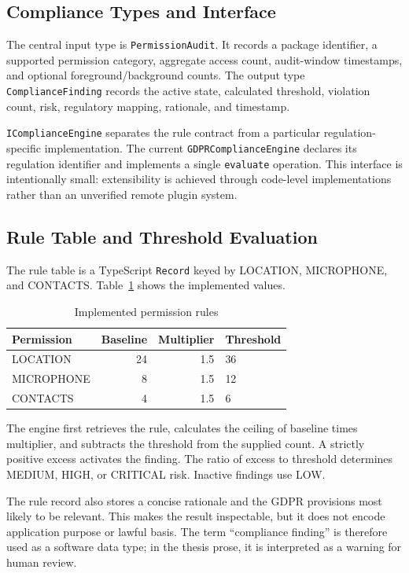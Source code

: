 \subsection{Compliance Types and Interface}

The central input type is \texttt{PermissionAudit}. It records a package identifier, a supported permission category, aggregate access count, audit-window timestamps, and optional foreground/background counts. The output type \texttt{ComplianceFinding} records the active state, calculated threshold, violation count, risk, regulatory mapping, rationale, and timestamp.

\texttt{IComplianceEngine} separates the rule contract from a particular regulation-specific implementation. The current \texttt{GDPRComplianceEngine} declares its regulation identifier and implements a single \texttt{evaluate} operation. This interface is intentionally small: extensibility is achieved through code-level implementations rather than an unverified remote plugin system.

\subsection{Rule Table and Threshold Evaluation}

The rule table is a TypeScript \texttt{Record} keyed by LOCATION, MICROPHONE, and CONTACTS. Table~\ref{tab:implemented-rules} shows the implemented values.

\begin{table}[H]
\centering
\caption{Implemented permission rules}
\label{tab:implemented-rules}
\begin{tabular}{lrrl}
\toprule
\textbf{Permission} & \textbf{Baseline} & \textbf{Multiplier} & \textbf{Threshold} \\
\midrule
LOCATION & 24 & 1.5 & 36 \\
MICROPHONE & 8 & 1.5 & 12 \\
CONTACTS & 4 & 1.5 & 6 \\
\bottomrule
\end{tabular}
\end{table}

The engine first retrieves the rule, calculates the ceiling of baseline times multiplier, and subtracts the threshold from the supplied count. A strictly positive excess activates the finding. The ratio of excess to threshold determines MEDIUM, HIGH, or CRITICAL risk. Inactive findings use LOW.

The rule record also stores a concise rationale and the GDPR provisions most likely to be relevant. This makes the result inspectable, but it does not encode application purpose or lawful basis. The term ``compliance finding'' is therefore used as a software data type; in the thesis prose, it is interpreted as a warning for human review.

